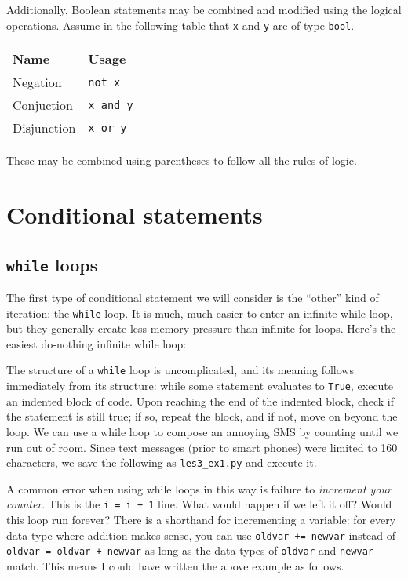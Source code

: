 \documentclass[m3380-lec-main.tex]{subfiles}
\begin{document}
Additionally, Boolean statements may be combined and modified using the logical operations. Assume in the following table that \verb|x| and \verb|y| are of type \verb|bool|.
\begin{center}\begin{tabular}{l|l}
\textbf{Name} & \textbf{Usage} \\ \hline
Negation & \verb|not x| \\
Conjuction & \verb|x and y|\\
Disjunction & \verb|x or y| \\
\end{tabular}\end{center}
These may be combined using parentheses to follow all the rules of logic.
 
\section{Conditional statements}
\subsection{\texttt{while} loops}
The first type of conditional statement we will consider is the ``other'' kind of iteration: the \verb|while| loop. It is much, much easier to enter an infinite while loop, but they generally create less memory pressure than infinite for loops. Here's the easiest do-nothing infinite while loop:

\smallskip\noindent
The structure of a \verb|while| loop is uncomplicated, and its meaning follows immediately from its structure: while some statement evaluates to \verb|True|, execute an indented block of code. Upon reaching the end of the indented block, check if the statement is still true; if so, repeat the block, and if not, move on beyond the loop. We can use a while loop to compose an annoying SMS by counting until we run out of room. Since text messages (prior to smart phones) were limited to 160 characters, we save the following as \verb|les3_ex1.py| and execute it.

\smallskip\noindent
A common error when using while loops in this way is failure to \emph{increment your counter}. This is the \verb|i = i + 1| line. What would happen if we left it off? Would this loop run forever? There is a shorthand for incrementing a variable: for every data type where addition makes sense, you can use \verb|oldvar += newvar| instead of \verb|oldvar = oldvar + newvar| as long as the data types of \verb|oldvar| and \verb|newvar| match. This means I could have written the above example as follows.
\end{document}
